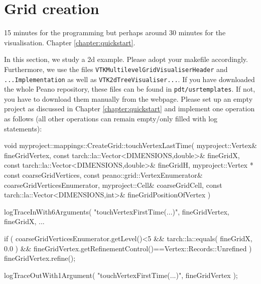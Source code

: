 \section{Grid creation}
\label{section:grid-creation}


\chapterDescription
  {
    15 minutes for the programming but perhaps around 30 minutes for the
    visualisation.
  }
  {
    Chapter \ref{chapter:quickstart}.
  }


In this section, we study a 2d example.
Please adopt your makefile accordingly.
Furthermore, we use the files \texttt{VTKMultilevelGridVisualiserHeader} and
\texttt{...Implementation} as well as
\texttt{VTK2dTreeVisualiser...}.
If you have downloaded the whole Peano repository, these files can be found in
\texttt{pdt/usrtemplates}.
If not, you have to download them manually from the webpage.
Please set up an empty project as discussed in Chapter
\ref{chapter:quickstart} and implement one operation as follows (all other
operations can remain empty/only filled with log statements):


\begin{code}
void myproject::mappings::CreateGrid::touchVertexLastTime(
      myproject::Vertex&               fineGridVertex,
      const tarch::la::Vector<DIMENSIONS,double>&                          fineGridX,
      const tarch::la::Vector<DIMENSIONS,double>&                          fineGridH,
      myproject::Vertex * const        coarseGridVertices,
      const peano::grid::VertexEnumerator&                coarseGridVerticesEnumerator,
      myproject::Cell&                 coarseGridCell,
      const tarch::la::Vector<DIMENSIONS,int>&                             fineGridPositionOfVertex
) {
  logTraceInWith6Arguments( "touchVertexFirstTime(...)", fineGridVertex, fineGridX, ...

  if (
    coarseGridVerticesEnumerator.getLevel()<5
    &&
    tarch::la::equals( fineGridX, 0.0 )
    &&
    fineGridVertex.getRefinementControl()==Vertex::Records::Unrefined
  ) {
    fineGridVertex.refine();
  }

  logTraceOutWith1Argument( "touchVertexFirstTime(...)", fineGridVertex );
}

\end{code}


